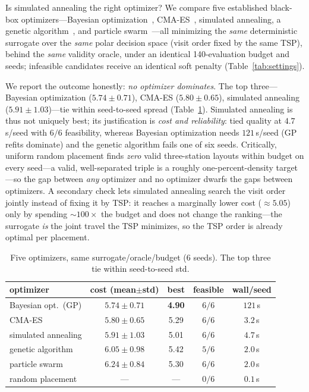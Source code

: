 \documentclass[conference]{IEEEtran}
\begin{document}
Is simulated annealing the right optimizer? We compare five established black-box
optimizers---Bayesian optimization~\cite{bo}, CMA-ES~\cite{cmaes}, simulated annealing, a
genetic algorithm~\cite{ga}, and particle swarm~\cite{pso}---all minimizing the \emph{same}
deterministic surrogate over the \emph{same} polar decision space (visit order fixed by the same
TSP), behind the \emph{same} validity oracle, under an identical 140-evaluation budget and
seeds; infeasible candidates receive an identical soft penalty
(Table~\ref{tab:settings}).

We report the outcome honestly: \emph{no optimizer dominates}. The top three---Bayesian
optimization ($5.74\pm0.71$), CMA-ES ($5.80\pm0.65$), simulated annealing
($5.91\pm1.03$)---tie within seed-to-seed spread (Table~\ref{tab:optcmp}). Simulated annealing
is thus not uniquely best; its justification is \emph{cost and reliability}: tied quality at
$4.7$\,s/seed with $6/6$ feasibility, whereas Bayesian optimization needs $121$\,s/seed
(GP refits dominate) and the genetic algorithm fails one of six seeds. Critically, uniform
random placement finds \emph{zero} valid three-station layouts within budget on every seed---a
valid, well-separated triple is a roughly one-percent-density target---so the gap between
\emph{any} optimizer and no optimizer dwarfs the gaps between optimizers. A secondary check
lets simulated annealing search the visit order jointly instead of fixing it by TSP: it reaches
a marginally lower cost ($\approx\!5.05$) only by spending $\sim\!100\times$ the budget and does
not change the ranking---the surrogate \emph{is} the joint travel the TSP minimizes, so the TSP
order is already optimal per placement.

\begin{table}[t]
\caption{Five optimizers, same surrogate/oracle/budget (6 seeds). The top three tie within
seed-to-seed std.}
\label{tab:optcmp}
\centering
\footnotesize
\setlength{\tabcolsep}{4pt}
\begin{tabular}{@{}lcccc@{}}
\toprule
optimizer & cost (mean$\pm$std) & best & feasible & wall/seed \\
\midrule
Bayesian opt.\ (GP) & $5.74\pm0.71$ & \textbf{4.90} & $6/6$ & $121$\,s \\
CMA-ES & $5.80\pm0.65$ & 5.29 & $6/6$ & $3.2$\,s \\
simulated annealing & $5.91\pm1.03$ & 5.01 & $6/6$ & $4.7$\,s \\
genetic algorithm & $6.05\pm0.98$ & 5.42 & $5/6$ & $2.0$\,s \\
particle swarm & $6.24\pm0.84$ & 5.30 & $6/6$ & $2.0$\,s \\
random placement & --- & --- & $0/6$ & $0.1$\,s \\
\bottomrule
\end{tabular}
\end{table}
\end{document}

